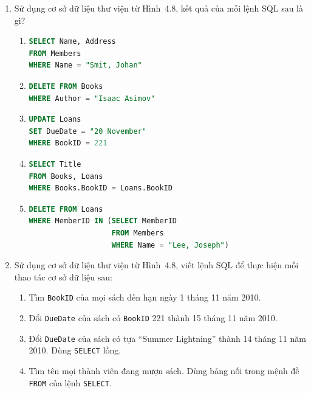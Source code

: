 \begin{enumerate}
\item[1.] Sử dụng cơ sở dữ liệu thư viện từ Hình~4.8, kết quả của mỗi lệnh SQL sau là gì?

\begin{enumerate}[label=\alph*)]
\item
\begin{lstlisting}[language=SQL]
SELECT Name, Address
FROM Members
WHERE Name = "Smit, Johan"
\end{lstlisting}

\item
\begin{lstlisting}[language=SQL]
DELETE FROM Books
WHERE Author = "Isaac Asimov"
\end{lstlisting}

\item
\begin{lstlisting}[language=SQL]
UPDATE Loans
SET DueDate = "20 November"
WHERE BookID = 221
\end{lstlisting}

\item
\begin{lstlisting}[language=SQL]
SELECT Title
FROM Books, Loans
WHERE Books.BookID = Loans.BookID
\end{lstlisting}

\item
\begin{lstlisting}[language=SQL]
DELETE FROM Loans
WHERE MemberID IN (SELECT MemberID
                   FROM Members
                   WHERE Name = "Lee, Joseph")
\end{lstlisting}
\end{enumerate}

\item[2.] Sử dụng cơ sở dữ liệu thư viện từ Hình~4.8, viết lệnh SQL để thực hiện mỗi thao tác cơ sở dữ liệu sau:
\begin{enumerate}[label=\alph*)]
\item Tìm \texttt{BookID} của mọi sách đến hạn ngày 1 tháng 11 năm 2010.
\item Đổi \texttt{DueDate} của sách có \texttt{BookID} 221 thành 15 tháng 11 năm 2010.
\item Đổi \texttt{DueDate} của sách có tựa ``Summer Lightning'' thành 14 tháng 11 năm 2010. Dùng \texttt{SELECT} lồng.
\item Tìm tên mọi thành viên đang mượn sách. Dùng bảng nối trong mệnh đề \texttt{FROM} của lệnh \texttt{SELECT}.
\end{enumerate}


\end{enumerate}
